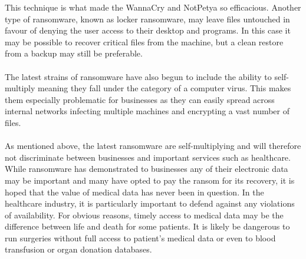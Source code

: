 \documentclass{article}
\begin{document}
This technique is what made the WannaCry and NotPetya so efficacious.
Another type of ransomware, known as locker ransomware, may leave files untouched in favour of denying the user access to their desktop and programs. In this case it may be possible to recover critical files from the machine, but a clean restore from a backup may still be preferable.
\\\\%
The latest strains of ransomware have also begun to include the ability to self-multiply meaning they fall under the category of a computer virus. This makes them especially problematic for businesses as they can easily spread across internal networks infecting multiple machines and encrypting a vast number of files.
\\\\%
As mentioned above, the latest ransomware are self-multiplying and will therefore not discriminate between businesses and important services such as healthcare.
While ransomware has demonstrated to businesses any of their electronic data may be important\cite{security_breaches_survey} and many have opted to pay the ransom for its recovery, it is hoped that the value of medical data has never been in question.
In the healthcare industry, it is particularly important to defend against any violations of availability.
For obvious reasons, timely access to medical data may be the difference between life and death for some patients.
It is likely be dangerous to run surgeries without full access to patient's medical data or even to blood transfusion or organ donation databases.

\end{document}
